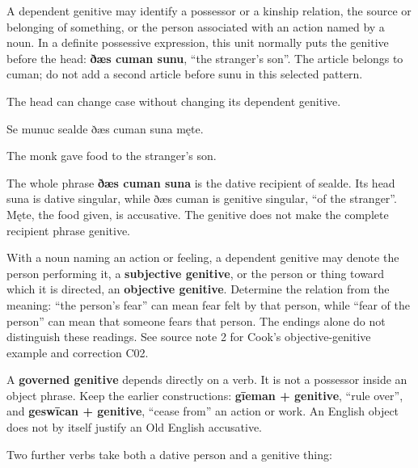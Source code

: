 A dependent genitive may identify a possessor or a kinship relation, the source or belonging of something, or the person associated with an action named by a noun. In a definite possessive expression, this unit normally puts the genitive before the head: \textbf{ðæs cuman sunu}, “the stranger's son”. The article belongs to cuman; do not add a second article before sunu in this selected pattern.

The head can change case without changing its dependent genitive.

Se munuc sealde ðæs cuman suna męte.

The monk gave food to the stranger’s son.

The whole phrase \textbf{ðæs cuman suna} is the dative recipient of sealde. Its head suna is dative singular, while ðæs cuman is genitive singular, “of the stranger”. Męte, the food given, is accusative. The genitive does not make the complete recipient phrase genitive.

With a noun naming an action or feeling, a dependent genitive may denote the person performing it, a \textbf{subjective genitive}, or the person or thing toward which it is directed, an \textbf{objective genitive}. Determine the relation from the meaning: “the person's fear” can mean fear felt by that person, while “fear of the person” can mean that someone fears that person. The endings alone do not distinguish these readings. See source note 2 for Cook's objective-genitive example and correction C02.

A \textbf{governed genitive} depends directly on a verb. It is not a possessor inside an object phrase. Keep the earlier constructions: \textbf{gīeman + genitive}, “rule over”, and \textbf{geswīcan + genitive}, “cease from” an action or work. An English object does not by itself justify an Old English accusative.

Two further verbs take both a dative person and a genitive thing:

